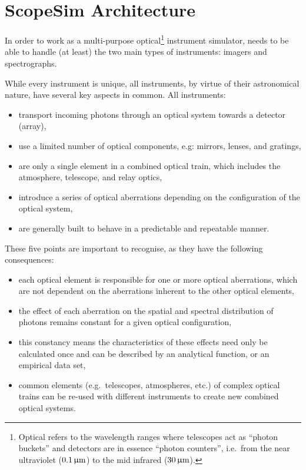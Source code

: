 

\section{ScopeSim Architecture}
\label{scopesim-architecture}

In order to work as a multi-purpose optical\footnote{Optical refers to the wavelength ranges where telescopes act as ``photon buckets'' and detectors are in essence ``photon counters'', i.e.~from the near ultraviolet ($0.1\,\upmu\mathrm{m}$) to the mid infrared ($30\,\upmu\mathrm{m}$).} instrument simulator, \ScopeSim{} needs to be able to handle (at least) the two main types of instruments: imagers and spectrographs.

While every instrument is unique, all instruments, by virtue of their astronomical nature, have several key aspects in common.
All instruments:

\begin{itemize}
\item transport incoming photons through an optical system towards a detector (array),

\item use a limited number of optical components, e.g: mirrors, lenses, and gratings,

\item are only a single element in a combined optical train, which includes the atmosphere, telescope, and relay optics,

\item introduce a series of optical aberrations depending on the configuration of the optical system,

\item are generally built to behave in a predictable and repeatable manner.
\end{itemize}

These five points are important to recognise, as they have the following consequences:

\begin{itemize}
\item each optical element is responsible for one or more optical aberrations, which are not dependent on the aberrations inherent to the other optical elements,

\item the effect of each aberration on the spatial and spectral distribution of photons remains constant for a given optical configuration,

\item this constancy means the characteristics of these effects need only be calculated once and can be described by an analytical function, or an empirical data set,

\item common elements (e.g.~telescopes, atmospheres, etc.) of complex optical trains can be re-used with different instruments to create new combined optical systems.
\end{itemize}

